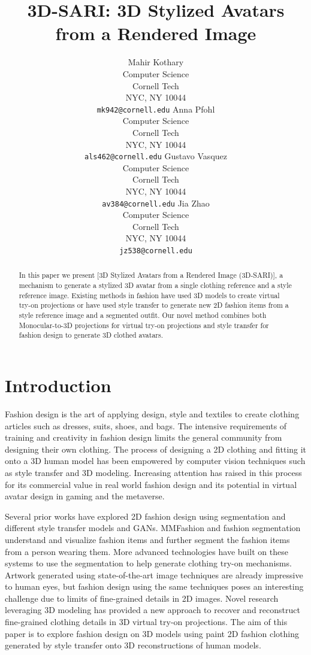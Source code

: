 \documentclass{article}
\title{3D-SARI: 3D Stylized Avatars from a Rendered Image}
\author{%
  Mahir Kothary\\
  Computer Science\\
  Cornell Tech\\
  NYC, NY 10044 \\
  \texttt{mk942@cornell.edu} 
 \And Anna Pfohl\\
  Computer Science\\
  Cornell Tech\\
  NYC, NY 10044 \\
  \texttt{als462@cornell.edu}
\AND
  Gustavo Vasquez \\
  Computer Science\\
  Cornell Tech\\
  NYC, NY 10044 \\
  \texttt{av384@cornell.edu}
\And
  Jia Zhao \\
  Computer Science\\
  Cornell Tech\\
  NYC, NY 10044 \\
  \texttt{jz538@cornell.edu}
}
\begin{document}
\maketitle


\begin{abstract}
In this paper we present [3D Stylized Avatars from a Rendered Image (3D-SARI)], a mechanism to generate a stylized 3D avatar from a single clothing reference and a style reference image. Existing methods in fashion have used 3D models to create virtual try-on projections or have used style transfer to generate new 2D fashion items from a style reference image and a segmented outfit. Our novel method combines both Monocular-to-3D projections for virtual try-on projections and style transfer for fashion design to generate 3D clothed avatars.
\end{abstract}

\section{Introduction}
Fashion design is the art of applying design, style and textiles to create clothing articles such as dresses, suits, shoes, and bags. The intensive requirements of training and creativity in fashion design limits the general community from designing their own clothing. The process of designing a 2D clothing and fitting it onto a 3D human model has been empowered by computer vision techniques such as style transfer and 3D modeling. Increasing attention has raised in this process for its commercial value in real world fashion design and its potential in virtual avatar design in gaming and the metaverse.

Several prior works have explored 2D fashion design using segmentation and different style transfer models and GANs. MMFashion\cite{liu2021fashionVisTool} and fashion segmentation\cite{wang2020fashionSegmentation} understand and visualize fashion items and further segment the fashion items from a person wearing them. More advanced technologies have built on these systems to use the segmentation to help generate clothing try-on mechanisms\cite{Pang2021tryon, Tiwari2021tryon}. Artwork generated using state-of-the-art image techniques are already impressive to human eyes, but fashion design using the same techniques poses an interesting challenge due to limits of fine-grained details in 2D images. Novel research leveraging 3D modeling has provided a new approach to recover and reconstruct fine-grained clothing details in 3D virtual try-on projections. The aim of this paper is to explore fashion design on 3D models using paint 2D fashion clothing generated by style transfer onto 3D reconstructions of human models.
\end{document}
